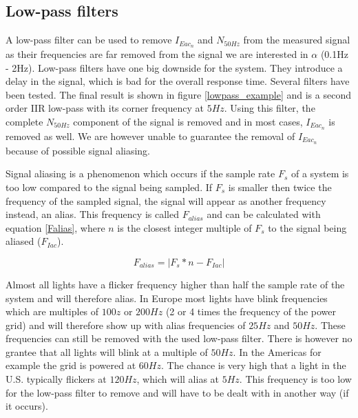 \subsection{Low-pass filters}
A low-pass filter can be used to remove $I_{Eac{_n}}$ and $N_{50Hz}$ from the measured signal as their frequencies are far removed from the signal we are interested in $\alpha$ (0.1Hz - 2Hz). Low-pass filters have one big downside for the system. They introduce a delay in the signal, which is bad for the overall response time. Several filters have been tested. The final result is shown in figure \ref{lowpass_example} and is a second order IIR low-pass with its corner frequency at $5Hz$. Using this filter, the complete $N_{50Hz}$ component of the signal is removed and in most cases, $I_{Eac{_n}}$ is removed as well. We are however unable to guarantee the removal of $I_{Eac{_n}}$ because of possible signal aliasing.

Signal aliasing is a phenomenon which occurs if the sample rate $F_{s}$ of a system is too low compared to the signal being sampled. If $F_{s}$ is smaller then twice the frequency of the sampled signal, the signal will appear as another frequency instead, an alias. This frequency is called $F_{alias}$ and can be calculated with equation \ref{Falias}, where $n$ is the closest integer multiple of $F_{s}$ to the signal being aliased ($F_{Iac}$).

\begin{equation}
\label{Falias}
	F_{alias} = |F_{s} * n - F_{Iac}|
\end{equation}

Almost all lights have a flicker frequency higher than half the sample rate of the system and will therefore alias. In Europe most lights have blink frequencies which are multiples of $100z$ or $200Hz$ (2 or 4 times the frequency of the power grid) and will therefore show up with alias frequencies of $25Hz$ and $50Hz$. These frequencies can still be removed with the used low-pass filter. There is however no grantee that all lights will blink at a multiple of $50Hz$. In the Americas for example the grid is powered at $60Hz$. The chance is very high that a light in the U.S. typically flickers at $120Hz$, which will alias at $5Hz$. This frequency is too low for the low-pass filter to remove and will have to be dealt with in another way (if it occurs).

